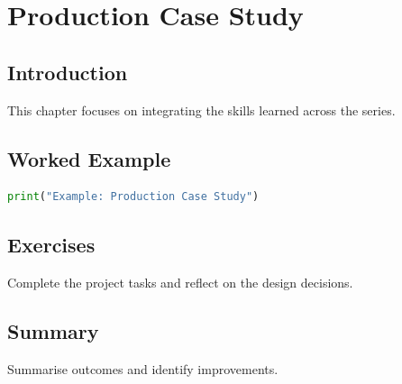 \chapter{Production Case Study}
\label{chap:vol11-4}
\section{Introduction}
This chapter focuses on integrating the skills learned across the series.
\section{Worked Example}
\begin{lstlisting}[language=Python]
print("Example: Production Case Study")
\end{lstlisting}
\section{Exercises}
\begin{exercise}
Complete the project tasks and reflect on the design decisions.
\end{exercise}
\section{Summary}
Summarise outcomes and identify improvements.
